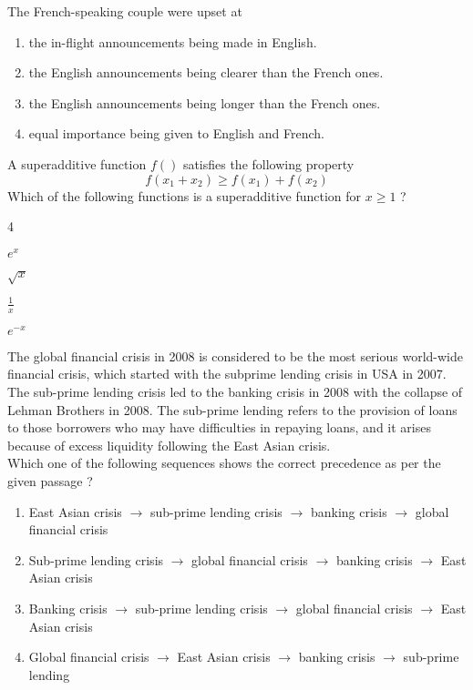 		The French-speaking couple were upset at
		\begin{enumerate}
			\item the in-flight announcements being made in English.
			\item the English announcements being clearer than the French ones.
			\item the English announcements being longer than the French ones.
			\item equal importance being given to English and French.
		\end{enumerate}
	\item A superadditive function $f( )$ satisfies the following property
		$$ f(x_1 + x_2) \geq f(x_1) + f(x_2) $$
		Which of the following functions is a superadditive function for $x \geq 1$ ?
		\begin{enumerate}
		\end{enumerate}
	\item The global financial crisis in 2008 is considered to be the most serious world-wide financial crisis, which started with the subprime lending crisis in USA in 2007. The sub-prime lending crisis led to the banking crisis in 2008 with the collapse of Lehman Brothers in 2008. The sub-prime lending refers to the provision of loans to those borrowers who may have difficulties in repaying loans, and it arises because of excess liquidity following the East Asian crisis. \\
		Which one of the following sequences shows the correct precedence as per the given passage ?
		\begin{enumerate}
			\item East Asian crisis $\rightarrow$ sub-prime lending crisis $\rightarrow$ banking crisis $\rightarrow$ global financial crisis
			\item Sub-prime lending crisis $\rightarrow$ global financial crisis $\rightarrow$ banking crisis $\rightarrow$ East Asian crisis
			\item Banking crisis $\rightarrow$ sub-prime lending crisis $\rightarrow$ global financial crisis $\rightarrow$ East Asian crisis
			\item Global financial crisis $\rightarrow$ East Asian crisis $\rightarrow$ banking crisis $\rightarrow$ sub-prime lending
		\end{enumerate}
